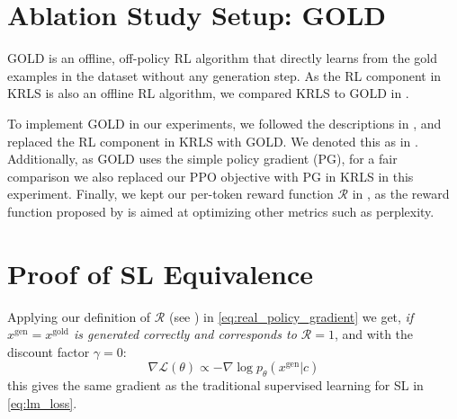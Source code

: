 \section{Ablation Study Setup: GOLD}
\label{sec:Ablation Study Setup: GOLD}
GOLD \cite{GOLD} is an offline, off-policy RL algorithm that directly learns from the gold examples in the dataset without any generation step. As the RL component in KRLS is also an offline RL algorithm, we compared KRLS to {GOLD} in .

To implement {GOLD} in our experiments, we followed the descriptions in \citet{GOLD}, and replaced the RL component in KRLS with {GOLD}. We denoted this as  in . 
Additionally, as {GOLD} uses the simple policy gradient (PG), for a fair comparison we also replaced our PPO objective with PG in KRLS in this experiment. Finally, we kept our per-token reward function $\mathcal{R}$ in , as the reward function proposed by \citet{GOLD} is aimed at optimizing other metrics such as perplexity.

\section{Proof of SL Equivalence}
\label{sec:Proof of SL Equivalence}

Applying our definition of $\mathcal{R}$ (see ) in \autoref{eq:real_policy_gradient} we get, \emph{if $x^{\mathrm{gen}} = x^{\mathrm{gold}}$ is generated correctly and corresponds to $\mathcal{R}=1$}, and with the discount factor $\gamma=0$:
\[
\nabla \mathcal{L}(\theta) \propto -\nabla \log p_\theta(x^{\mathrm{gen}}|c)
\] 
this gives the same gradient as the traditional supervised learning for SL in \autoref{eq:lm_loss}.
